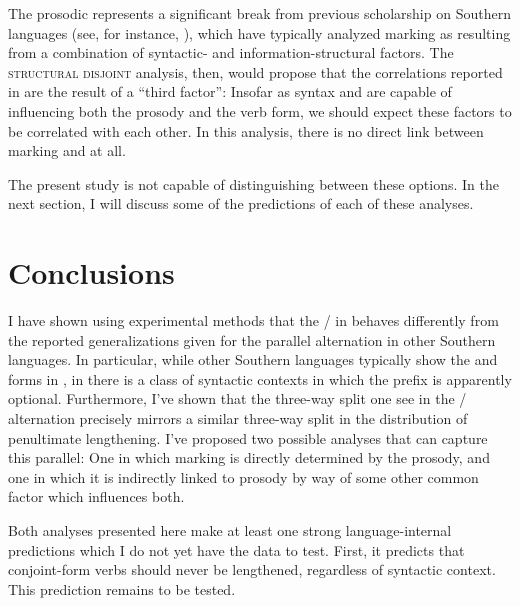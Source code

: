\documentclass[output=paper,modfonts,nonflat,hidelinks]{langsci/langscibook}
\begin{document}
\largerpage
The prosodic  represents a significant break from previous
scholarship on Southern  languages (see, for instance,
\citealt{Buell2005,ChengDowning2009}), which have typically analyzed 
marking as resulting from a combination of syntactic- and
information-structural factors. The \textsc{structural disjoint} analysis,
then, would propose that the correlations reported in
 are the result of a ``third factor'': Insofar
as syntax and  are capable of influencing both the prosody
and the verb form, we should expect these factors to be correlated with each
other. In this analysis, there is no direct link between  marking and
 at all.

The present study is not capable of distinguishing between these options. In
the next section, I will discuss some of the predictions of each of these
analyses.

\section{Conclusions}\label{sec:kusmer:conclusion}


I have shown using experimental methods that the \slash {} in
 behaves differently from the reported generalizations given for the
parallel alternation in other Southern  languages. In particular, while
other Southern  languages typically show the  and  forms
in , in  there is a class of syntactic
contexts in which the  prefix is apparently optional. Furthermore, I've
shown that the three-way split one see in the \slash {} alternation
precisely mirrors a similar three-way split in the distribution of penultimate
lengthening. I've proposed two possible analyses that can capture this
parallel: One in which  marking is directly determined by the prosody,
and one in which it is indirectly linked to prosody by way of some other common
factor which influences both.

Both analyses presented here make at least one strong language-internal
predictions which I do not yet have the data to test. First, it predicts that
conjoint-form verbs should never be lengthened, regardless of syntactic
context. This prediction remains to be tested.
\end{document}
